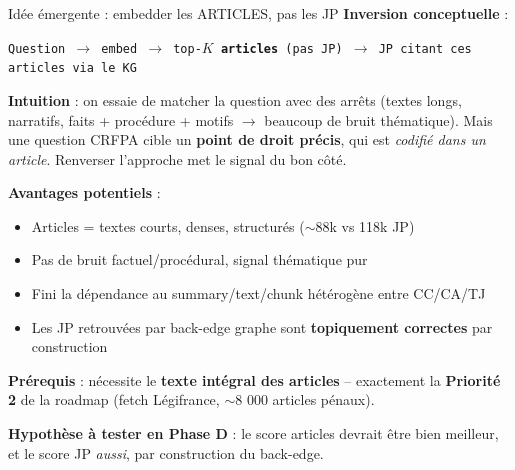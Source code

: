 \documentclass[aspectratio=169,10pt]{beamer}
\newcommand{\keybox}[1]{%
  \begin{center}
  \colorbox{accentsoft}{\parbox{0.92\linewidth}{\centering #1}}
  \end{center}}
\begin{document}
\begin{frame}{Idée émergente : embedder les ARTICLES, pas les JP}
  \footnotesize
  \textbf{Inversion conceptuelle} :
  \begin{center}
  \texttt{Question $\to$ embed $\to$ top-$K$ \textbf{articles} (pas JP) $\to$ JP citant ces articles via le KG}
  \end{center}

  \vspace{0.5em}
  \textbf{Intuition} : on essaie de matcher la question avec des arrêts (textes longs, narratifs, faits + procédure + motifs $\to$ beaucoup de bruit thématique). Mais une question CRFPA cible un \textbf{point de droit précis}, qui est \textit{codifié dans un article}. Renverser l'approche met le signal du bon côté.

  \vspace{0.5em}
  \textbf{Avantages potentiels} :
  \begin{itemize}\footnotesize
    \item Articles = textes courts, denses, structurés ($\sim$88k vs 118k JP)
    \item Pas de bruit factuel/procédural, signal thématique pur
    \item Fini la dépendance au summary/text/chunk hétérogène entre CC/CA/TJ
    \item Les JP retrouvées par back-edge graphe sont \textbf{topiquement correctes} par construction
  \end{itemize}

  \vspace{0.5em}
  \keybox{\textbf{Prérequis} : nécessite le \textbf{texte intégral des articles} -- exactement la \textbf{Priorité 2} de la roadmap (fetch Légifrance, $\sim$8 000 articles pénaux).}

  \vspace{0.3em}
  \textbf{Hypothèse à tester en Phase D} : le score articles devrait être bien meilleur, et le score JP \textit{aussi}, par construction du back-edge.
\end{frame}
\end{document}

